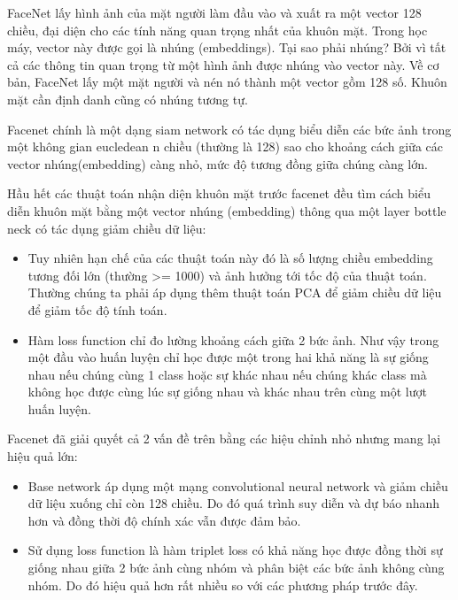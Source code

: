 FaceNet lấy hình ảnh của mặt người làm đầu vào và xuất ra một vector 128 chiều,
đại diện cho các tính năng quan trọng nhất của khuôn mặt.
Trong học máy, vector này được gọi là nhúng (embeddings).
Tại sao phải nhúng? Bởi vì tất cả các thông tin quan trọng từ một hình ảnh được nhúng
vào vector này. Về cơ bản, FaceNet lấy một mặt người và nén nó thành một vector gồm 128 số.
Khuôn mặt cần định danh cũng có nhúng tương tự.

Facenet chính là một dạng siam network có tác dụng biểu diễn các bức ảnh trong một không
gian eucledean n chiều (thường là 128) sao cho khoảng cách giữa các vector nhúng(embedding)
càng nhỏ, mức độ tương đồng giữa chúng càng lớn.

Hầu hết các thuật toán nhận diện khuôn mặt trước facenet đều tìm cách biểu diễn
khuôn mặt bằng một vector nhúng (embedding) thông qua một layer bottle neck có tác dụng
giảm chiều dữ liệu:

\begin{itemize}
    \item Tuy nhiên hạn chế của các thuật toán này đó là số lượng chiều embedding
          tương đối lớn (thường >= 1000) và ảnh hưởng tới tốc độ của thuật toán.
          Thường chúng ta phải áp dụng thêm thuật toán PCA để giảm chiều dữ liệu để giảm
          tốc độ tính toán.
    \item Hàm loss function chỉ đo lường khoảng cách giữa 2 bức ảnh.
          Như vậy trong một đầu vào huấn luyện chỉ học được một trong hai khả năng
          là sự giống nhau nếu chúng cùng 1 class hoặc sự khác nhau nếu chúng khác
          class mà không học được cùng lúc sự giống nhau và khác nhau trên cùng một
          lượt huấn luyện.
\end{itemize}

Facenet đã giải quyết cả 2 vấn đề trên bằng các hiệu chỉnh nhỏ nhưng mang lại hiệu quả lớn:

\begin{itemize}
    \item Base network áp dụng một mạng convolutional neural network và giảm chiều dữ
          liệu xuống chỉ còn 128 chiều. Do đó quá trình suy diễn và dự báo nhanh hơn và
          đồng thời độ chính xác vẫn được đảm bảo.
    \item Sử dụng loss function là hàm triplet loss có khả năng học được đồng thời
          sự giống nhau giữa 2 bức ảnh cùng nhóm và phân biệt các bức ảnh không cùng nhóm.
          Do đó hiệu quả hơn rất nhiều so với các phương pháp trước đây.
\end{itemize}

